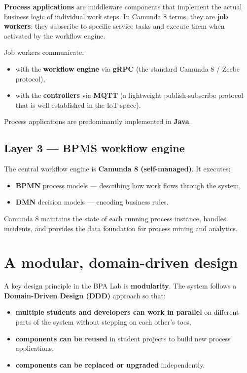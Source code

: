 \documentclass[
  english,
  11pt,
  a4paper,
]{scrbook}
\providecommand{\tightlist}{%
  \setlength{\itemsep}{0pt}\setlength{\parskip}{0pt}}
\begin{document}
\textbf{Process applications} are middleware components that implement
the actual business logic of individual work steps. In Camunda 8 terms,
they are \textbf{job workers}: they subscribe to specific service tasks
and execute them when activated by the workflow engine.

Job workers communicate:

\begin{itemize}
\tightlist
\item
  with the \textbf{workflow engine} via \textbf{gRPC} (the standard
  Camunda 8 / Zeebe protocol),
\item
  with the \textbf{controllers} via \textbf{MQTT} (a lightweight
  publish-subscribe protocol that is well established in the IoT space).
\end{itemize}

Process applications are predominantly implemented in \textbf{Java}.

\subsection{Layer 3 --- BPMS workflow
engine}\label{layer-3-bpms-workflow-engine}

The central workflow engine is \textbf{Camunda 8 (self-managed)}. It
executes:

\begin{itemize}
\tightlist
\item
  \textbf{BPMN} process models --- describing how work flows through the
  system,
\item
  \textbf{DMN} decision models --- encoding business rules.
\end{itemize}

Camunda 8 maintains the state of each running process instance, handles
incidents, and provides the data foundation for process mining and
analytics.

\section{A modular, domain-driven
design}\label{a-modular-domain-driven-design}

A key design principle in the BPA Lab is \textbf{modularity}. The system
follows a \textbf{Domain-Driven Design (DDD)} approach so that:

\begin{itemize}
\tightlist
\item
  \textbf{multiple students and developers can work in parallel} on
  different parts of the system without stepping on each other's toes,
\item
  \textbf{components can be reused} in student projects to build new
  process applications,
\item
  \textbf{components can be replaced or upgraded} independently.
\end{itemize}
\end{document}
